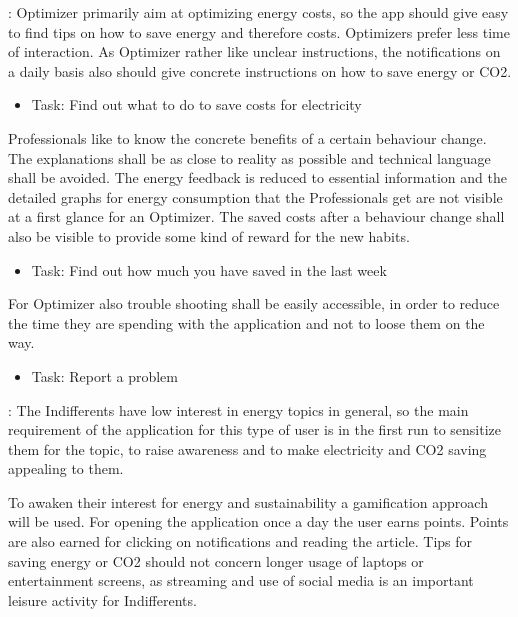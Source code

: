 \begin{enumerate}
	: Optimizer primarily aim at optimizing energy costs, so the app should give easy to find tips on how to save energy and therefore costs. Optimizers prefer less time of interaction. As Optimizer rather like unclear instructions, the notifications on a daily basis also should give concrete instructions on how to save energy or CO2.
	
	\begin{itemize}
		\item Task: Find out what to do to save costs for electricity
	\end{itemize}
	
	 Professionals like to know the concrete benefits of a certain behaviour change. The explanations shall be as close to reality as possible and technical language shall be avoided. The energy feedback is reduced to essential information and the detailed graphs for energy consumption that the Professionals get are not visible at a first glance for an Optimizer. The saved costs after a behaviour change shall also be visible to provide some kind of reward for the new habits.
	 
	 \begin{itemize}
	 	\item Task: Find out how much you have saved in the last week
	 \end{itemize}
	
	For Optimizer also trouble shooting shall be easily accessible, in order to reduce the time they are spending with the application and not to loose them on the way.
	
	\begin{itemize}
		\item Task: Report a problem
	\end{itemize}
	
	:
	The Indifferents have low interest in energy topics in general, so the main requirement of the application for this type of user is in the first run to sensitize them for the topic, to raise awareness and to make electricity and CO2 saving appealing to them. 
	
	To awaken their interest for energy and sustainability a gamification approach will be used. For opening the application once a day the user earns points. Points are also earned for clicking on notifications and reading the article. Tips for saving energy or CO2 should not concern longer usage of laptops or entertainment screens, as streaming and use of social media is an important leisure activity for Indifferents.
	

\end{enumerate}
